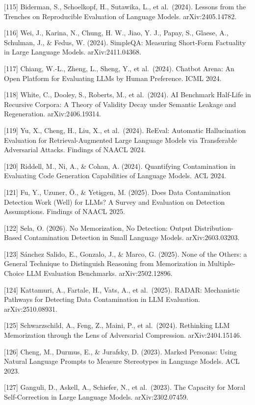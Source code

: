 {[}115{]} Biderman, S., Schoelkopf, H., Sutawika, L., et al.~(2024). Lessons from the Trenches on Reproducible Evaluation of Language Models. arXiv:2405.14782.

{[}116{]} Wei, J., Karina, N., Chung, H. W., Jiao, Y. J., Papay, S., Glaese, A., Schulman, J., \& Fedus, W. (2024). SimpleQA: Measuring Short-Form Factuality in Large Language Models. arXiv:2411.04368.

{[}117{]} Chiang, W.-L., Zheng, L., Sheng, Y., et al.~(2024). Chatbot Arena: An Open Platform for Evaluating LLMs by Human Preference. ICML 2024.

{[}118{]} White, C., Dooley, S., Roberts, M., et al.~(2024). AI Benchmark Half-Life in Recursive Corpora: A Theory of Validity Decay under Semantic Leakage and Regeneration. arXiv:2406.19314.

{[}119{]} Yu, X., Cheng, H., Liu, X., et al.~(2024). ReEval: Automatic Hallucination Evaluation for Retrieval-Augmented Large Language Models via Transferable Adversarial Attacks. Findings of NAACL 2024.

{[}120{]} Riddell, M., Ni, A., \& Cohan, A. (2024). Quantifying Contamination in Evaluating Code Generation Capabilities of Language Models. ACL 2024.

{[}121{]} Fu, Y., Uzuner, Ö., \& Yetişgen, M. (2025). Does Data Contamination Detection Work (Well) for LLMs? A Survey and Evaluation on Detection Assumptions. Findings of NAACL 2025.

{[}122{]} Sela, O. (2026). No Memorization, No Detection: Output Distribution-Based Contamination Detection in Small Language Models. arXiv:2603.03203.

{[}123{]} Sánchez Salido, E., Gonzalo, J., \& Marco, G. (2025). None of the Others: a General Technique to Distinguish Reasoning from Memorization in Multiple-Choice LLM Evaluation Benchmarks. arXiv:2502.12896.

{[}124{]} Kattamuri, A., Fartale, H., Vats, A., et al.~(2025). RADAR: Mechanistic Pathways for Detecting Data Contamination in LLM Evaluation. arXiv:2510.08931.

{[}125{]} Schwarzschild, A., Feng, Z., Maini, P., et al.~(2024). Rethinking LLM Memorization through the Lens of Adversarial Compression. arXiv:2404.15146.

{[}126{]} Cheng, M., Durmus, E., \& Jurafsky, D. (2023). Marked Personas: Using Natural Language Prompts to Measure Stereotypes in Language Models. ACL 2023.

{[}127{]} Ganguli, D., Askell, A., Schiefer, N., et al.~(2023). The Capacity for Moral Self-Correction in Large Language Models. arXiv:2302.07459.

